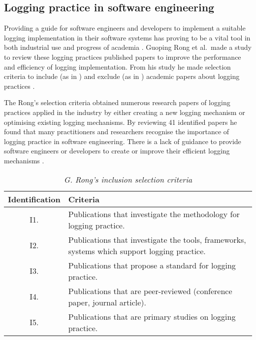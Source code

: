 \subsection{Logging practice in software engineering}
Providing a guide for software engineers and developers to implement a suitable logging implementation in their software systems has proving to be a vital tool in both industrial use and progress of academia \cite{Rong2018a}. Guoping Rong et al.~made a study to review these logging practices published papers to improve the performance and efficiency of logging implementation. From his study he made selection criteria to include (as in ) and exclude (as in ) academic papers about logging practices \cite{Rong2018a,Rong2018}.\par The Rong's selection criteria obtained numerous research papers of logging practices applied in the industry by either creating a new logging mechanism or optimising existing logging mechanisms. By reviewing 41 identified papers he found that many practitioners and researchers recognise the importance of logging practice in software engineering. There is a lack of guidance to provide software engineers or developers to create or improve their efficient logging mechanisms \cite{Rong2018a,Zhu2015}. 

\begin{table}[!htb]
	\centering
	\small
	\caption[G. Rong's inclusion selection criteria]
	{\textit{G. Rong's inclusion selection criteria \cite{Rong2018a}}}
	\label{tbl:CH1_RongIncSelectionCriteria}
	\begin{tabularx}{\textwidth}{|c|X|}
		\hline \textbf{Identification} & \textbf{Criteria} \\
		\hline I1. & Publications that investigate the methodology for logging practice. \\
		\hline I2. & Publications that investigate the tools, frameworks, systems which support logging practice. \\
		\hline I3. & Publications that propose a standard for logging practice.\\
		\hline I4. & Publications that are peer-reviewed (conference paper, journal article). \\
		\hline I5. & Publications that are primary studies on logging practice. \\
		\hline
	\end{tabularx}
\end{table}

